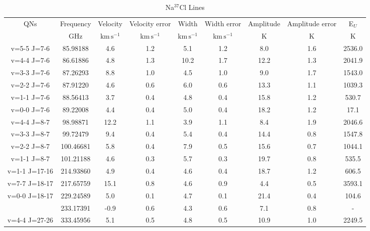 \begin{table*}[htp]
\centering
\caption{Na$^{37}$Cl Lines}
\begin{tabular}{ccccccccc}
\label{tab:Na37Cl_salt_lines}
QNs & Frequency & Velocity & Velocity error & Width & Width error & Amplitude & Amplitude error & E$_U$ \\
 & $\mathrm{GHz}$ & $\mathrm{km\,s^{-1}}$ & $\mathrm{km\,s^{-1}}$ & $\mathrm{km\,s^{-1}}$ & $\mathrm{km\,s^{-1}}$ & $\mathrm{K}$ & $\mathrm{K}$ & $\mathrm{K}$ \\
\hline
v=5-5 J=7-6 & 85.98188 & 4.6 & 1.2 & 5.1 & 1.2 & 8.0 & 1.6 & 2536.0 \\
v=4-4 J=7-6 & 86.61886 & 4.8 & 1.3 & 10.2 & 1.7 & 12.2 & 1.3 & 2041.9 \\
v=3-3 J=7-6 & 87.26293 & 8.8 & 1.0 & 4.5 & 1.0 & 9.0 & 1.7 & 1543.0 \\
v=2-2 J=7-6 & 87.91220 & 4.6 & 0.6 & 6.0 & 0.6 & 13.3 & 1.1 & 1039.3 \\
v=1-1 J=7-6 & 88.56413 & 3.7 & 0.4 & 4.8 & 0.4 & 15.8 & 1.2 & 530.7 \\
v=0-0 J=7-6 & 89.22008 & 4.4 & 0.4 & 5.0 & 0.4 & 18.2 & 1.2 & 17.1 \\
v=4-4 J=8-7 & 98.98871 & 12.2 & 1.1 & 3.9 & 1.1 & 8.4 & 1.9 & 2046.6 \\
v=3-3 J=8-7 & 99.72479 & 9.4 & 0.4 & 5.4 & 0.4 & 14.4 & 0.8 & 1547.8 \\
v=2-2 J=8-7 & 100.46681 & 5.8 & 0.4 & 7.9 & 0.5 & 15.6 & 0.7 & 1044.1 \\
v=1-1 J=8-7 & 101.21188 & 4.6 & 0.3 & 5.7 & 0.3 & 19.7 & 0.8 & 535.5 \\
v=1-1 J=17-16 & 214.93860 & 4.9 & 0.4 & 4.6 & 0.4 & 18.7 & 1.2 & 606.5 \\
v=7-7 J=18-17 & 217.65759 & 15.1 & 0.8 & 4.6 & 0.9 & 4.4 & 0.5 & 3593.1 \\
v=0-0 J=18-17 & 229.24589 & 5.0 & 0.1 & 4.7 & 0.1 & 21.4 & 0.4 & 104.6 \\
 & 233.17391 & -0.9 & 0.6 & 4.3 & 0.6 & 7.1 & 0.8 & - \\
v=4-4 J=27-26 & 333.45956 & 5.1 & 0.5 & 4.8 & 0.5 & 10.9 & 1.0 & 2249.5 \\
\hline
\end{tabular}

\par 
\end{table*}

